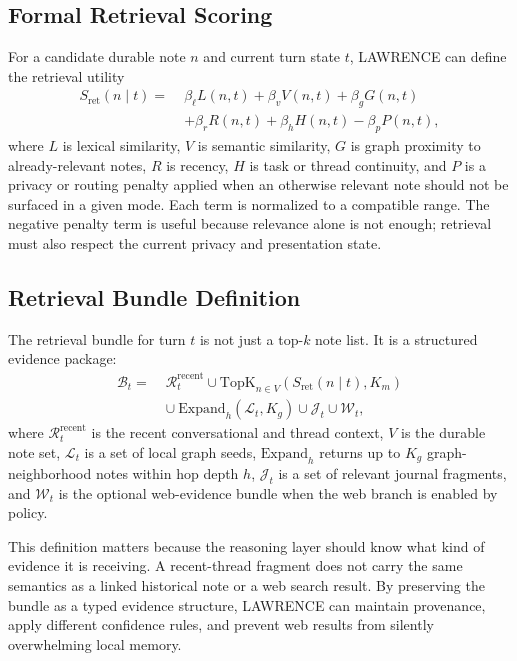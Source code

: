 \documentclass[conference]{IEEEtran}
\begin{document}
\subsection{Formal Retrieval Scoring}
For a candidate durable note $n$ and current turn state $t$, LAWRENCE can define the retrieval utility
\begin{equation}
\label{eq:retrieval}
\begin{aligned}
S_{\mathrm{ret}}(n \mid t) =\;&
\beta_\ell L(n,t) +
\beta_v V(n,t) +
\beta_g G(n,t) \\
&+
\beta_r R(n,t) +
\beta_h H(n,t) -
\beta_p P(n,t),
\end{aligned}
\end{equation}
where $L$ is lexical similarity, $V$ is semantic similarity, $G$ is graph proximity to already-relevant notes, $R$ is recency, $H$ is task or thread continuity, and $P$ is a privacy or routing penalty applied when an otherwise relevant note should not be surfaced in a given mode. Each term is normalized to a compatible range. The negative penalty term is useful because relevance alone is not enough; retrieval must also respect the current privacy and presentation state.

\subsection{Retrieval Bundle Definition}
The retrieval bundle for turn $t$ is not just a top-$k$ note list. It is a structured evidence package:
\begin{equation}
\label{eq:bundle}
\begin{aligned}
\mathcal{B}_t =\;&
\mathcal{R}^{\mathrm{recent}}_t \cup
\mathrm{TopK}_{n \in V}(S_{\mathrm{ret}}(n \mid t), K_m) \\
&\cup\ \mathrm{Expand}_h(\mathcal{L}_t, K_g) \cup
\mathcal{J}_t \cup
\mathcal{W}_t,
\end{aligned}
\end{equation}
where $\mathcal{R}^{\mathrm{recent}}_t$ is the recent conversational and thread context, $V$ is the durable note set, $\mathcal{L}_t$ is a set of local graph seeds, $\mathrm{Expand}_h$ returns up to $K_g$ graph-neighborhood notes within hop depth $h$, $\mathcal{J}_t$ is a set of relevant journal fragments, and $\mathcal{W}_t$ is the optional web-evidence bundle when the web branch is enabled by policy.

This definition matters because the reasoning layer should know what kind of evidence it is receiving. A recent-thread fragment does not carry the same semantics as a linked historical note or a web search result. By preserving the bundle as a typed evidence structure, LAWRENCE can maintain provenance, apply different confidence rules, and prevent web results from silently overwhelming local memory.
\end{document}
